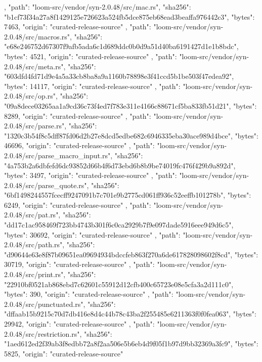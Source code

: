 {{    },
    {
      "path": "loom-src/vendor/syn-2.0.48/src/mac.rs",
      "sha256": "b1cf73f34a27a8f1429125e726623a524fb5dce875eb68ead3beaffa976442c3",
      "bytes": 7463,
      "origin": "curated-release-source"
    },
    {
      "path": "loom-src/vendor/syn-2.0.48/src/macros.rs",
      "sha256": "e68e246752d67307f9afb5ada6c1d689ddc0b0d9a51d40ba6191427d1e1b8bdc",
      "bytes": 4521,
      "origin": "curated-release-source"
    },
    {
      "path": "loom-src/vendor/syn-2.0.48/src/meta.rs",
      "sha256": "603dfd4fd71d9e4a5a33cb8ba8a9a1160b78898e3f41ccd5b1be503f47edea92",
      "bytes": 14117,
      "origin": "curated-release-source"
    },
    {
      "path": "loom-src/vendor/syn-2.0.48/src/op.rs",
      "sha256": "09a8dece03265aa1a9cd36c73f4ed7f783e311e4166c88671cf5ba833fb51d21",
      "bytes": 8289,
      "origin": "curated-release-source"
    },
    {
      "path": "loom-src/vendor/syn-2.0.48/src/parse.rs",
      "sha256": "1320c3b54f8c5dff87fd06d2b27e8dcd5edbe682c6946335eba30ace989d4bce",
      "bytes": 46696,
      "origin": "curated-release-source"
    },
    {
      "path": "loom-src/vendor/syn-2.0.48/src/parse_macro_input.rs",
      "sha256": "4a753b2a6dbfefd6dc93852d66b4f6d73ebd6b8b9be74019fc476f429b9a892d",
      "bytes": 3497,
      "origin": "curated-release-source"
    },
    {
      "path": "loom-src/vendor/syn-2.0.48/src/parse_quote.rs",
      "sha256": "6bf1498244557fcecff9247091b7c701e9b2775cd061ff936c52eeffb101278b",
      "bytes": 6249,
      "origin": "curated-release-source"
    },
    {
      "path": "loom-src/vendor/syn-2.0.48/src/pat.rs",
      "sha256": "dd17c1ac958469f723bb4743b301f6c0ca2929b7f9e097dade5916eee949d6c5",
      "bytes": 30692,
      "origin": "curated-release-source"
    },
    {
      "path": "loom-src/vendor/syn-2.0.48/src/path.rs",
      "sha256": "d90644e63e8f87b09651ea09694934bdccfeb863f270a6de617828098602f8cd",
      "bytes": 30719,
      "origin": "curated-release-source"
    },
    {
      "path": "loom-src/vendor/syn-2.0.48/src/print.rs",
      "sha256": "22910bf0521ab868ebd7c62601c55912d12cfb400c65723e08e5cfa3a2d111c0",
      "bytes": 390,
      "origin": "curated-release-source"
    },
    {
      "path": "loom-src/vendor/syn-2.0.48/src/punctuated.rs",
      "sha256": "dffaab15b9215c70d7db416e8d4c44b78c43ba2f255485e6211363f0f0fea063",
      "bytes": 29942,
      "origin": "curated-release-source"
    },
    {
      "path": "loom-src/vendor/syn-2.0.48/src/restriction.rs",
      "sha256": "1aed612ed2f39ab3f8edbb72a8f2aa506e5b6eb4d9f05f1b97d9bb32369a3fc9",
      "bytes": 5825,
      "origin": "curated-release-source"
}}
